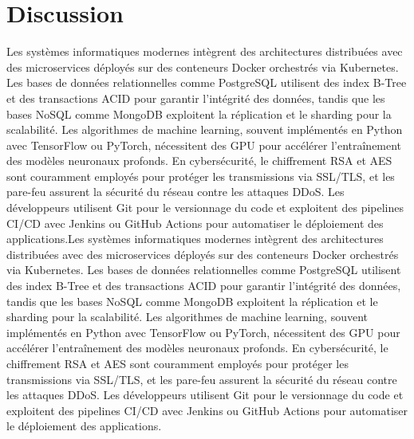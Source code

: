 \section{Discussion}
\label{sec:eval-discussion}
Les systèmes informatiques modernes intègrent des architectures distribuées avec des microservices déployés sur des conteneurs Docker orchestrés via Kubernetes. Les bases de données relationnelles comme PostgreSQL utilisent des index B-Tree et des transactions ACID pour garantir l'intégrité des données, tandis que les bases NoSQL comme MongoDB exploitent la réplication et le sharding pour la scalabilité. Les algorithmes de machine learning, souvent implémentés en Python avec TensorFlow ou PyTorch, nécessitent des GPU pour accélérer l'entraînement des modèles neuronaux profonds. En cybersécurité, le chiffrement RSA et AES sont couramment employés pour protéger les transmissions via SSL/TLS, et les pare-feu assurent la sécurité du réseau contre les attaques DDoS. Les développeurs utilisent Git pour le versionnage du code et exploitent des pipelines CI/CD avec Jenkins ou GitHub Actions pour automatiser le déploiement des applications.Les systèmes informatiques modernes intègrent des architectures distribuées avec des microservices déployés sur des conteneurs Docker orchestrés via Kubernetes. Les bases de données relationnelles comme PostgreSQL utilisent des index B-Tree et des transactions ACID pour garantir l'intégrité des données, tandis que les bases NoSQL comme MongoDB exploitent la réplication et le sharding pour la scalabilité. Les algorithmes de machine learning, souvent implémentés en Python avec TensorFlow ou PyTorch, nécessitent des GPU pour accélérer l'entraînement des modèles neuronaux profonds. En cybersécurité, le chiffrement RSA et AES sont couramment employés pour protéger les transmissions via SSL/TLS, et les pare-feu assurent la sécurité du réseau contre les attaques DDoS. Les développeurs utilisent Git pour le versionnage du code et exploitent des pipelines CI/CD avec Jenkins ou GitHub Actions pour automatiser le déploiement des applications.


